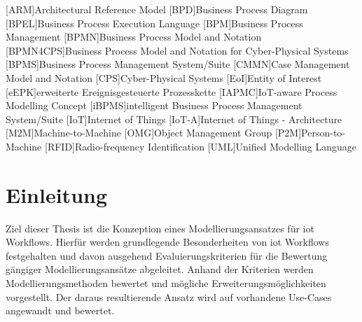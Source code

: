 \documentclass[a4paper, 12pt, twoside, headsepline=true]{scrartcl} %
\begin{document}
\tableofcontents
\clearpage
\newpage


\begin{acronym}[header=Abkürzungsverzeichnis]
	[ARM]{Architectural Reference Model}
	[BPD]{Business Process Diagram}
	[BPEL]{Business Process Execution Language}
	[BPM]{Business Process Management}
	[BPMN]{Business Process Model and Notation}
	[BPMN4CPS]{Business Process Model and Notation for Cyber-Physical Systems}
	[BPMS]{Business Process Management System/Suite}
	[CMMN]{Case Management Model and Notation}
	[CPS]{Cyber-Physical Systems}
	[EoI]{Entity of Interest}
	[eEPK]{erweiterte Ereignisgesteuerte Prozesskette}
	[IAPMC]{IoT-aware Process Modelling Concept}
	[iBPMS]{intelligent Business Process Management System/Suite}
	[IoT]{Internet of Things}
	[IoT-A]{Internet of Things - Architecture}
	[M2M]{Machine-to-Machine}
	[OMG]{Object Management Group}
	[P2M]{Person-to-Machine}
	[RFID]{Radio-frequency Identification}
	[UML]{Unified Modelling Language}
\end{acronym}

\clearpage


\listoftables

\clearpage

\listoffigures
\clearpage


\section{Einleitung} \label{sec:section}
Ziel dieser Thesis ist die Konzeption eines Modellierungsansatzes für \ac{iot}
Workflows. Hierfür werden grundlegende Besonderheiten von \ac{iot} Workflows festgehalten und davon ausgehend Evaluierungskriterien für die Bewertung gängiger Modellierungsansätze abgeleitet. Anhand der Kriterien werden Modellierungsmethoden bewertet und mögliche Erweiterungsmöglichkeiten vorgestellt. Der daraus resultierende Ansatz wird auf vorhandene Use-Cases angewandt und bewertet.
\end{document}
